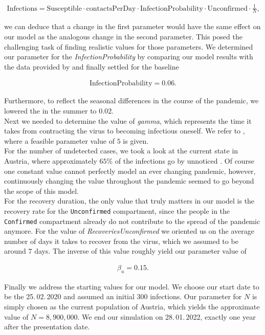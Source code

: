 \documentclass
[
    a4paper,
    11pt,
    bibliography = totoc,
    listof = totoc,
    headinclude = true,
]
{scrreport}
\begin{document}
\begin{align*}
  \text{Infections} = \text{Susceptible} \cdot \text{contactsPerDay} \cdot
  \text{InfectionProbability} \cdot
  \text{Unconfirmed} \cdot \frac{1}{N},
\end{align*}

we can deduce that a change in the first parameter would have the same effect on our model
as the analogous change in the second parameter.
This posed the challenging task of finding realistic values for those parameters.
We determined our parameter for the \textit{InfectionProbability} by comparing
our model results with the data provided by \cite{OrfCorona} and finally
settled for the baseline

\begin{align*}
  \text{InfectionProbability} = 0.06.
\end{align*}

Furthermore, to reflect the seasonal differences in the course of the pandemic,
we lowered the  in the summer to $0.02$. \\
Next we needed to determine the value of \textit{gamma}, which represents the time
it takes from contracting the virus to becoming infectious oneself.
We refer to \cite{RobertKochInstitut}, where a feasible parameter value of $5$ is given. \\
For the number of undetected cases, we took a look at the current state in Austria,
where approximately $65\%$ of the infections go by unnoticed \cite{MassTests}.
Of course one constant value cannot perfectly model an ever changing pandemic, however, continuously changing the value throughout the pandemic seemed to go beyond the scope of this model. \\
For the recovery duration, the only value that truly matters in our model
is the recovery rate for the \texttt{Unconfirmed} compartment, since the people in the
\texttt{Confirmed} compartment already do not contribute to the spread of the pandemic anymore.
For the value of \textit{RecoveriesUnconfirmed} we oriented us on the average number of days
it takes to recover from the virus, which we assumed to be around $7$ days.
The inverse of this value roughly yield our parameter value of

\begin{align*}
  \beta_u = 0.15.
\end{align*}

Finally we address the starting values for our model. We choose our start date
to be the 25.\,02.\,2020 and assumed an initial 300 infections.
Our parameter for $N$ is simply chosen as the current population of Austria,
which yields the approximate value of $N = 8,900,000$.
We end our simulation on 28.\,01.\,2022, exactly one year after the presentation date.
\end{document}
